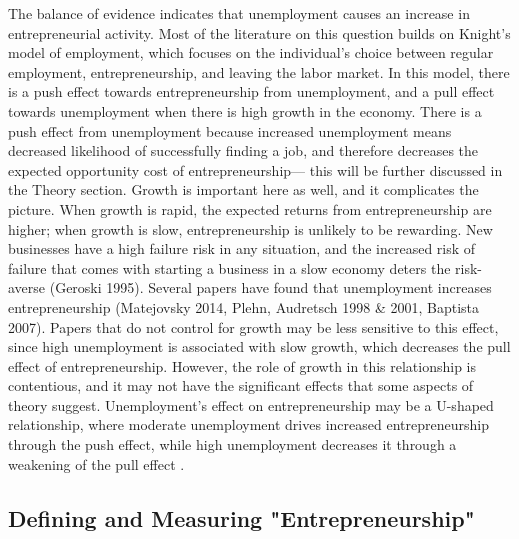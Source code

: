 \documentclass[]{ecca}
\begin{document}
The balance of evidence indicates that unemployment causes an increase in entrepreneurial activity. Most of the literature on this question builds on Knight's model of employment, which focuses on the individual's choice between regular employment, entrepreneurship, and leaving the labor market. In this model, there is a push effect towards entrepreneurship from unemployment, and a pull effect towards unemployment when there is high growth in the economy. There is a push effect from unemployment because increased unemployment means decreased likelihood of successfully finding a job, and therefore decreases the expected opportunity cost of entrepreneurship--- this will be further discussed in the Theory section. Growth is important here as well, and it complicates the picture. When growth is rapid, the expected returns from entrepreneurship are higher; when growth is slow, entrepreneurship is unlikely to be rewarding. New businesses have a high failure risk in any situation, and the increased risk of failure that comes with starting a business in a slow economy deters the risk-averse (Geroski 1995). Several papers have found that unemployment increases entrepreneurship (Matejovsky 2014, Plehn, Audretsch 1998 \& 2001, Baptista 2007). Papers that do not control for growth may be less sensitive to this effect, since high unemployment is associated with slow growth, which decreases the pull effect of entrepreneurship. However, the role of growth in this relationship is contentious, and it may not have the significant effects that some aspects of theory suggest.  Unemployment's effect on entrepreneurship may be a U-shaped relationship, where moderate unemployment drives increased entrepreneurship through the push effect, while high unemployment decreases it through a weakening of the pull effect \citep{berglann11}. 

\subsection{Defining and Measuring "Entrepreneurship"}
\end{document}
